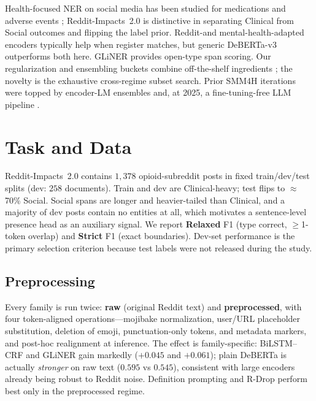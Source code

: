 \documentclass[11pt]{article}
\begin{document}
Health-focused NER on social media has been studied for medications and adverse events \citep{sarker2019social,weissenbacher2022overview}; Reddit-Impacts~2.0 \citep{dey2025reddit} is distinctive in separating Clinical from Social outcomes and flipping the label prior. Reddit-and mental-health-adapted encoders \citep{guo2023socbert,stressroberta2022} typically help when register matches, but generic DeBERTa-v3 \citep{he2023debertav3} outperforms both here. GLiNER \citep{zaratiana2024gliner} provides open-type span scoring. Our regularization and ensembling buckets combine off-the-shelf ingredients \citep{lin2017focal,liang2021rdrop,miyato2017adversarial,izmailov2018swa,wortsman2022modelsoup,kuncheva2003measures}; the novelty is the exhaustive cross-regime subset search. Prior SMM4H iterations were topped by encoder-LM ensembles \citep{obeidat2024ukynlp} and, at 2025, a fine-tuning-free LLM pipeline \citep{pradhan2025llmpros,klein2025overview}.

\section{Task and Data}
\label{sec:data}

Reddit-Impacts~2.0 contains $1{,}378$ opioid-subreddit posts in fixed
train/dev/test splits (dev: $258$ documents). Train and dev are
Clinical-heavy; test flips to $\approx$70\% Social. Social spans are
longer and heavier-tailed than Clinical, and a majority of dev posts
contain no entities at all, which motivates a sentence-level presence
head as an auxiliary signal. We report \textbf{Relaxed} F1 (type
correct, $\geq$1-token overlap) and \textbf{Strict} F1 (exact
boundaries). Dev-set performance is the primary selection criterion
because test labels were not released during the study.

\subsection{Preprocessing}
\label{sec:preproc}

Every family is run twice: \textbf{raw} (original Reddit text) and \textbf{preprocessed}, with four token-aligned operations---mojibake normalization, user/URL placeholder substitution, deletion of emoji, punctuation-only tokens, and metadata markers, and post-hoc realignment at inference. The effect is family-specific: BiLSTM--CRF and GLiNER gain markedly ($+0.045$ and $+0.061$); plain DeBERTa is actually \emph{stronger} on raw text ($0.595$ vs $0.545$), consistent with large encoders already being robust to Reddit noise. Definition prompting and R-Drop perform best only in the preprocessed regime.
\end{document}

